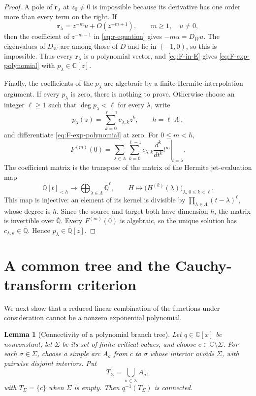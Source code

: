 \documentclass[11pt]{article}
\numberwithin{equation}{section}
\newtheorem{lemma}[lemma]{Lemma}
\theoremstyle{definition}
\theoremstyle{remark}
\newcommand{\C}{\mathbb C}
\newcommand{\Qbar}{\overline{\mathbb Q}}
\begin{document}
\begin{proof}
A pole of $\mathbf r_\lambda$ at $z_0\ne0$ is impossible because
its derivative has one order more than every term on the right.  If
\[
  \mathbf r_\lambda=z^{-m}u+O(z^{-m+1}),
  \qquad m\ge1,
  \quad u\ne0,
\]
then the coefficient of $z^{-m-1}$ in \eqref{eq:r-equation} gives
$-mu=D_Wu$.  The eigenvalues of $D_W$ are among those of $D$ and lie in
$(-1,0)$, so this is impossible.  Thus every $\mathbf r_\lambda$ is a
polynomial vector, and \eqref{eq:F-in-E} gives
\eqref{eq:F-exp-polynomial} with $p_\lambda\in\C[z]$.

Finally, the coefficients of the $p_\lambda$ are algebraic by a finite
Hermite-interpolation argument.  If every $p_\lambda$ is zero, there is
nothing to prove.  Otherwise choose an integer $\ell\ge1$ such that
$\deg p_\lambda<\ell$ for every $\lambda$, write
\[
  p_\lambda(z)=\sum_{k=0}^{\ell-1}c_{\lambda,k}z^k,
  \qquad h=\ell|\Lambda|,
\]
and differentiate \eqref{eq:F-exp-polynomial} at zero.  For $0\le m<h$,
\[
  F^{(m)}(0)
  =\sum_{\lambda\in\Lambda}\sum_{k=0}^{\ell-1}
    c_{\lambda,k}
    \left.\frac{d^k}{dt^k}t^m\right|_{t=\lambda}.
\]
The coefficient matrix is the transpose of the matrix of the Hermite
jet-evaluation map
\[
  \Qbar[t]_{<h}\longrightarrow
  \bigoplus_{\lambda\in\Lambda}\Qbar^\ell,
  \qquad
  H\longmapsto
  \bigl(H^{(k)}(\lambda)\bigr)_{\lambda,\,0\le k<\ell}.
\]
This map is injective: an element of its kernel is divisible by
$\prod_{\lambda\in\Lambda}(t-\lambda)^\ell$, whose degree is $h$.
Since the source and target both have dimension $h$, the matrix is
invertible over $\Qbar$.  Every $F^{(m)}(0)$ is algebraic, so the unique
solution has $c_{\lambda,k}\in\Qbar$.  Hence
$p_\lambda\in\Qbar[z]$.
\end{proof}

\section{A common tree and the Cauchy-transform criterion}
\label{sec:common-tree}

We next show that a reduced linear combination of the functions under
consideration cannot be a nonzero exponential polynomial.

\begin{lemma}[Connectivity of a polynomial branch tree]
\label{lem:branch-tree-connectivity}
Let $q\in\C[x]$ be nonconstant, let $\Sigma$ be its set of finite critical
values, and choose $c\in\C\setminus\Sigma$.  For each
$\sigma\in\Sigma$, choose a simple arc $A_\sigma$ from $c$ to $\sigma$
whose interior avoids $\Sigma$, with pairwise disjoint interiors.  Put
\[
  T_\Sigma=\bigcup_{\sigma\in\Sigma}A_\sigma,
\]
with $T_\Sigma=\{c\}$ when $\Sigma$ is empty.  Then
$q^{-1}(T_\Sigma)$ is connected.
\end{lemma}
\end{document}
